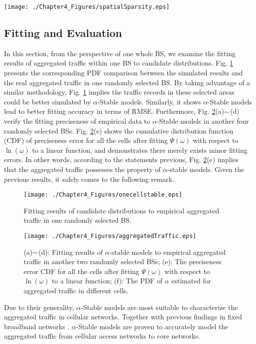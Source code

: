 \begin{figure*}
	\centering
	\texttt{[image: ./Chapter4\_Figures/spatialSparsity.eps]}
	\caption{The snapshots of aggregated traffic at three different moments in a region containing 23 base stations.}
	\label{fig:spatialSparsity}
\end{figure*}
\subsection{Fitting and Evaluation}
In this section, from the perspective of one whole BS, we examine the fitting results of aggregated traffic within one BS to candidate distributions. Fig. \ref{fig:onecellstable} presents the corresponding PDF comparison between the simulated results and the real aggregated traffic in one randomly selected BS. By taking advantage of a similar methodology, Fig. \ref{fig:onecellstable} implies the traffic records in these selected areas could be better simulated by $\alpha$-Stable models. Similarly, it shows $\alpha$-Stable models lead to better fitting accuracy in terms of RMSE. Furthermore, Fig. \ref{fig:aggregatedTraffic}(a)$\scriptsize{\sim}$(d) verify the fitting preciseness of empirical data to $\alpha$-Stable models in another four randomly selected BSs.
Fig. \ref{fig:aggregatedTraffic}(e) shows the cumulative distribution function (CDF) of preciseness error for all the cells after fitting $\Psi(\omega)$ with respect to $\ln (\omega) $ to a linear function, and demonstrates there merely exists minor fitting errors. In other words, according to the statements previous, Fig. \ref{fig:aggregatedTraffic}(e) implies that the aggregated traffic possesses the property of $\alpha$-stable models. Given the previous results, it safely comes to the following remark.
\begin{figure}
	\centering
	\texttt{[image: ./Chapter4\_Figures/onecellstable.eps]}
	\caption{Fitting results of candidate distributions to empirical aggregated traffic in one randomly selected BS.}
	\label{fig:onecellstable}
\end{figure}

\begin{figure}[htp]
\centering
\texttt{[image: ./Chapter4\_Figures/aggregatedTraffic.eps]}
\caption{(a)$\scriptsize{\sim}$(d): Fitting results of $\alpha$-stable models to empirical aggregated traffic in another two randomly selected BSs; (e): The preciseness error CDF for all the cells after fitting $\Psi(\omega)$ with respect to $ \ln (\omega) $ to a linear function; (f): The PDF of $\alpha$ estimated for aggregated traffic in different cells.}
\label{fig:aggregatedTraffic}
\end{figure}
\begin{remark}
Due to their generality, $\alpha$-Stable models are most suitable to characterize the aggregated traffic in cellular networks. Together with previous findings in fixed broadband networks \cite{gallardo2000use,xiaohu2004testing}, $\alpha$-Stable models are proven to accurately model the aggregated traffic from cellular access networks to core networks.
\end{remark}

